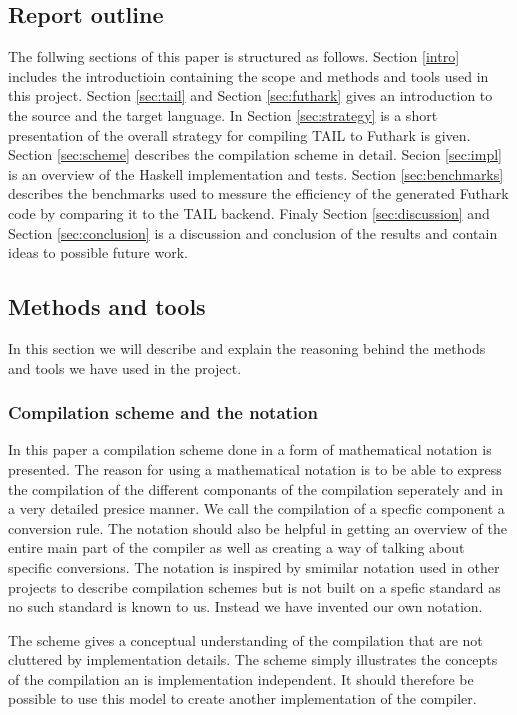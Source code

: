 \documentclass[11pt]{article}
\begin{document}
\subsection{Report outline}
The follwing sections of this paper is structured as follows. 
Section \ref{intro} includes the introductioin containing the scope and methods and tools used in this project. 
Section \ref{sec:tail} and Section \ref{sec:futhark} gives an introduction to the source and the target language. 
In Section \ref{sec:strategy} is a short presentation of the overall strategy for compiling TAIL to Futhark is given.
Section \ref{sec:scheme} describes the compilation scheme in detail. Secion \ref{sec:impl} is an overview of the Haskell implementation and tests. Section \ref{sec:benchmarks} describes the benchmarks used to messure the efficiency of the generated Futhark code by comparing it to the TAIL backend. Finaly Section \ref{sec:discussion} and Section \ref{sec:conclusion} is a discussion and conclusion of the results and contain ideas to possible future work. 

\subsection{Methods and tools}
\label{methods}
In this section we will describe and explain the reasoning behind the methods and tools we have used in the project. 

\subsubsection{Compilation scheme and the notation}
In this paper a compilation scheme done in a form of mathematical notation is presented. 
The reason for using a mathematical notation is to be able to express the compilation of the different componants of the compilation seperately and in a very detailed presice manner. We call the compilation of a specfic component a conversion rule. 
The notation should also be helpful in getting an overview of the entire main part of the compiler as well as creating a way of talking about specific conversions.
The notation is inspired by smimilar notation used in other projects \cite{TorbenMogensen}\cite{MartinElsmanNotation} to describe compilation schemes but is not built on a spefic standard as no such standard is known to us.
Instead we have invented our own notation.

The scheme gives a conceptual understanding of the compilation that are not cluttered by implementation details.
The scheme simply illustrates the concepts of the compilation an is implementation independent.
It should therefore be possible to use this model to create another implementation of the compiler.
\end{document}
